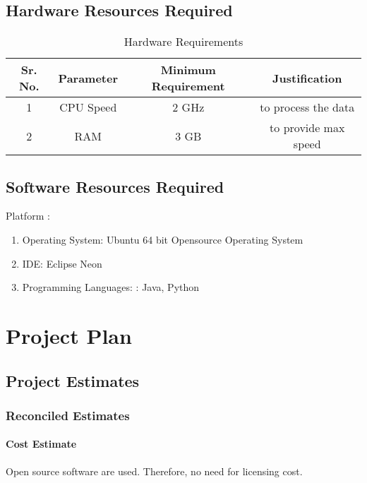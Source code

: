 \documentclass[oneside,a4paper,12pt]{book}
\begin{document}
\begin{enumerate}
\section{Hardware Resources Required}
\begin{table}[!htbp]
\begin{center}
\def\arraystretch{1.5}
  \begin{tabular}{| c | c | c | c |}
\hline
Sr. No. &	Parameter &	Minimum Requirement & Justification \\
\hline
1 &	CPU Speed &	 2 GHz  & to process the data\\
\hline
2 &	RAM  &	3 GB &  to provide max speed\\
 \hline
\end{tabular}
 \caption { Hardware Requirements }
 \label{tab:hreq}
\end{center}

\end{table}


\section{Software Resources Required}
Platform : 
\begin{enumerate}
\item Operating System: Ubuntu 64 bit Opensource Operating System
\item IDE: Eclipse Neon 
\item Programming Languages: : Java, Python 
\end{enumerate}




\chapter{Project Plan}

\section{Project Estimates}
                  
\subsection{Reconciled Estimates}
\subsubsection{Cost Estimate}

Open source software are used. Therefore, no need for licensing cost.


\end{enumerate}
\end{document}
